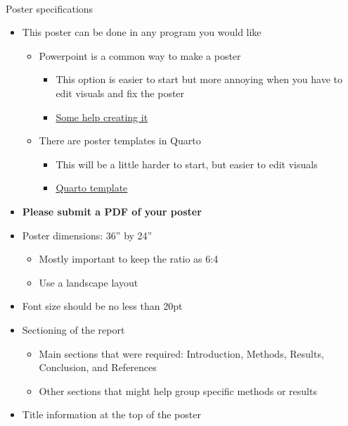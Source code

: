 \documentclass[
  letterpaper,
  DIV=11,
  numbers=noendperiod]{scrartcl}
\makeatletter
\let\oldparagraph\paragraph
\renewcommand{\paragraph}{
    \@ifstar
      \xxxParagraphStar
      \xxxParagraphNoStar
  }
\newcommand{\xxxParagraphStar}[1]{\oldparagraph*{#1}\mbox{}}
\newcommand{\xxxParagraphNoStar}[1]{\oldparagraph{#1}\mbox{}}
\providecommand{\tightlist}{%
  \setlength{\itemsep}{0pt}\setlength{\parskip}{0pt}}\usepackage{longtable,booktabs,array}
\makeatother
\begin{document}
\paragraph{Poster specifications}\label{poster-specifications}

\begin{itemize}
\tightlist
\item
  This poster can be done in any program you would like

  \begin{itemize}
  \tightlist
  \item
    Powerpoint is a common way to make a poster

    \begin{itemize}
    \tightlist
    \item
      This option is easier to start but more annoying when you have to
      edit visuals and fix the poster
    \item
      \href{https://www.slidesai.io/blog/how-to-make-a-poster-powerpoint}{Some
      help creating it}
    \end{itemize}
  \item
    There are poster templates in Quarto

    \begin{itemize}
    \tightlist
    \item
      This will be a little harder to start, but easier to edit visuals
    \item
      \href{https://github.com/quarto-ext/typst-templates/tree/main/poster}{Quarto
      template}
    \end{itemize}
  \end{itemize}
\item
  \textbf{Please submit a PDF of your poster}
\item
  Poster dimensions: 36'' by 24''

  \begin{itemize}
  \tightlist
  \item
    Mostly important to keep the ratio as 6:4
  \item
    Use a landscape layout
  \end{itemize}
\item
  Font size should be no less than 20pt
\item
  Sectioning of the report

  \begin{itemize}
  \tightlist
  \item
    Main sections that were required: Introduction, Methods, Results,
    Conclusion, and References
  \item
    Other sections that might help group specific methods or results
  \end{itemize}
\item
  Title information at the top of the poster


\end{itemize}
\end{document}
